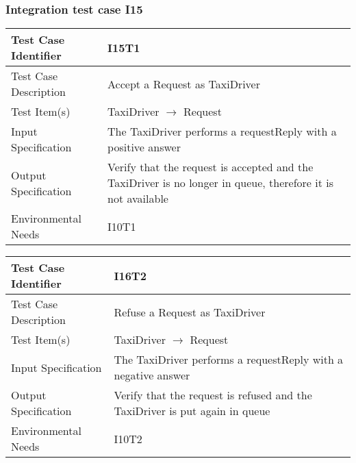 		\subsubsection{Integration test case I15}
		\begin{center}
			\begin{tabular}{ |l p{10cm}| } \hline
				Test Case Identifier & I15T1 \\ \hline
				Test Case Description & Accept a Request as TaxiDriver \\ \hline
				Test Item(s) & TaxiDriver $\rightarrow$ Request \\ \hline
				Input Specification & The TaxiDriver performs a requestReply with a positive answer  \\ \hline
				Output Specification & Verify that the request is accepted and the TaxiDriver is no longer in queue, therefore it is not available \\ \hline
				Environmental Needs & I10T1 \\ \hline
			\end{tabular}
			\begin{tabular}{ |l p{10cm}| } \hline
				Test Case Identifier & I16T2 \\ \hline
				Test Case Description & Refuse a Request as TaxiDriver \\ \hline
				Test Item(s) & TaxiDriver $\rightarrow$ Request \\ \hline
				Input Specification & The TaxiDriver performs a requestReply with a negative answer \\ \hline
				Output Specification & Verify that the request is refused and the TaxiDriver is put again in queue \\ \hline
				Environmental Needs & I10T2 \\ \hline
			\end{tabular}
		\end{center}
